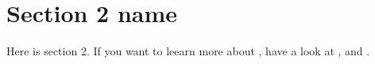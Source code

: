 \section{Section 2 name}\label{sec:ch2label}
Here is section 2. If you want to leearn  more about \LaTeXe{}, have a look at \cite{Madsen2010}, \cite{Oetiker2010} and \cite{Mittelbach2005}.
